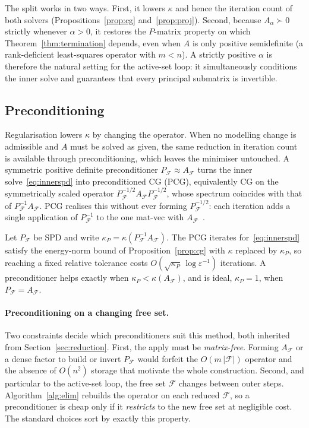 The split works in two ways. First, it lowers $\kappa$ and hence the iteration count of both
solvers (Propositions~\ref{prop:cg} and~\ref{prop:proj}). Second, because $A_\alpha \succ 0$
strictly whenever $\alpha > 0$, it restores the $P$-matrix property on which
Theorem~\ref{thm:termination} depends, even when $A$ is only positive semidefinite (a
rank-deficient least-squares operator with $m < n$). A strictly positive $\alpha$ is therefore the natural
setting for the active-set loop: it simultaneously conditions the inner solve and guarantees
that every principal submatrix is invertible.

\subsection{Preconditioning}\label{ssec:precond}

Regularisation lowers $\kappa$ by changing the operator. When no modelling change is
admissible and $A$ must be solved as given, the same reduction in iteration count is available
through preconditioning, which leaves the minimiser untouched. A symmetric positive definite
preconditioner $P_{\mathcal{F}} \approx A_{\mathcal{F}}$ turns the inner
solve~\eqref{eq:innerspd} into preconditioned CG (PCG), equivalently CG on the symmetrically
scaled operator $P_{\mathcal{F}}^{-1/2} A_{\mathcal{F}} P_{\mathcal{F}}^{-1/2}$, whose spectrum
coincides with that of $P_{\mathcal{F}}^{-1} A_{\mathcal{F}}$. PCG realises this without ever
forming $P_{\mathcal{F}}^{-1/2}$: each iteration adds a single application of
$P_{\mathcal{F}}^{-1}$ to the one mat-vec with $A_{\mathcal{F}}$~\cite{golub2013,benzi2005}.

\begin{proposition}\label{prop:pcg}
  Let $P_{\mathcal{F}}$ be SPD and write $\kappa_P = \kappa(P_{\mathcal{F}}^{-1}
  A_{\mathcal{F}})$. The PCG iterates for~\eqref{eq:innerspd} satisfy the energy-norm bound of
  Proposition~\ref{prop:cg} with $\kappa$ replaced by $\kappa_P$, so reaching a fixed relative
  tolerance costs $O(\sqrt{\kappa_P}\,\log\varepsilon^{-1})$ iterations. A preconditioner helps
  exactly when $\kappa_P < \kappa(A_{\mathcal{F}})$, and is ideal, $\kappa_P = 1$, when
  $P_{\mathcal{F}} = A_{\mathcal{F}}$.
\end{proposition}

\paragraph{Preconditioning on a changing free set.}
Two constraints decide which preconditioners suit this method, both inherited from
Section~\ref{sec:reduction}. First, the apply must be \emph{matrix-free}. Forming
$A_{\mathcal{F}}$ or a dense factor to build or invert $P_{\mathcal{F}}$ would forfeit the
$O(m\,|\mathcal{F}|)$ operator and the absence of $O(n^2)$ storage that motivate the whole
construction. Second, and particular to the active-set loop, the free set $\mathcal{F}$
changes between outer steps. Algorithm~\ref{alg:elim} rebuilds the operator on each reduced
$\mathcal{F}$, so a preconditioner is cheap only if it \emph{restricts} to the new free set at
negligible cost. The standard choices sort by exactly this property.

